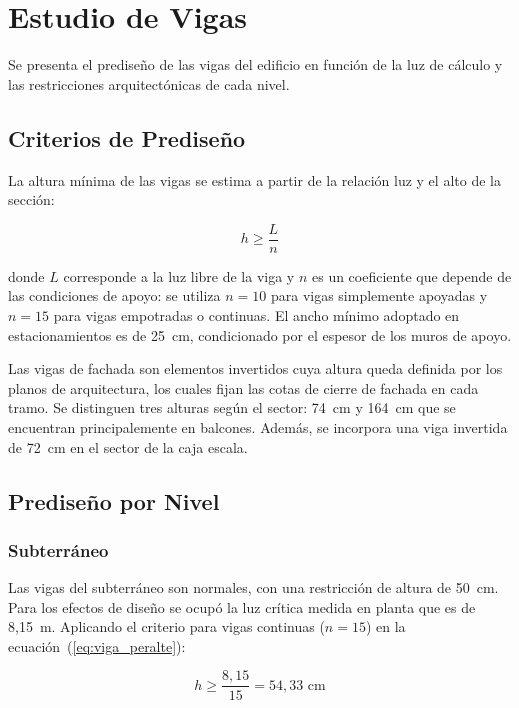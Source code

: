 \section{Estudio de Vigas}

Se presenta el prediseño de las vigas del edificio en función de la luz de 
cálculo y las restricciones arquitectónicas de cada nivel.

\subsection{Criterios de Prediseño}

La altura mínima de las vigas se estima a partir de la relación luz y el alto de la sección:

\begin{equation}
    h \geq \frac{L}{n}
    \label{eq:viga_peralte}
\end{equation}

donde $L$ corresponde a la luz libre de la viga y $n$ es un coeficiente que 
depende de las condiciones de apoyo: se utiliza $n = 10$ para vigas simplemente 
apoyadas y $n = 15$ para vigas empotradas o continuas. El ancho mínimo adoptado en estacionamientos es de 25~cm, 
condicionado por el espesor de los muros de apoyo.


Las vigas de fachada son elementos invertidos cuya altura queda 
definida por los planos de arquitectura, los cuales fijan las cotas de 
cierre de fachada en cada tramo. Se distinguen tres alturas según el sector:
74~cm y 164~cm que se encuentran principalemente en balcones. Además, se incorpora una viga invertida de 72~cm en el sector de la caja escala.

\subsection{Prediseño por Nivel}

\subsubsection{Subterráneo}

Las vigas del subterráneo son normales, con una restricción de altura de 50~cm. Para los efectos de diseño se ocupó la luz crítica medida en planta que es de 8{,}15~m. Aplicando 
el criterio para vigas continuas ($n = 15$) en la ecuación~(\ref{eq:viga_peralte}):

\[
    h \geq \frac{8{,}15}{15} =  54{,}33 \text{ cm}
\]


